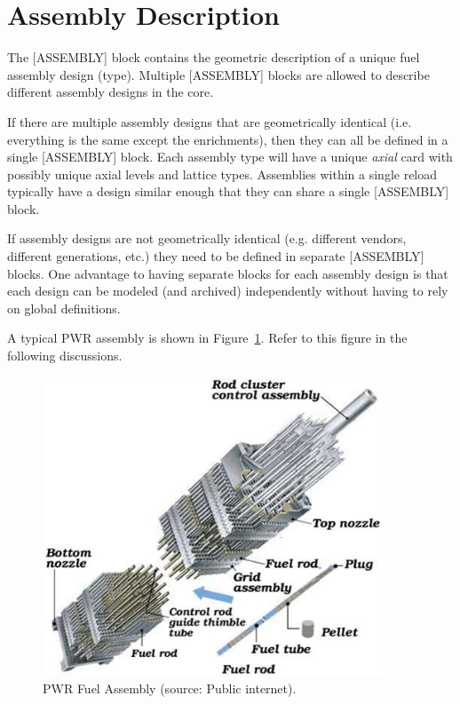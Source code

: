 %
%
\section{Assembly Description}

The [ASSEMBLY] block contains the geometric description of a unique fuel assembly design (type).
Multiple [ASSEMBLY] blocks are allowed to describe different assembly designs in the core.

If there are multiple assembly designs that are geometrically identical (i.e. everything is the same except
the enrichments), then they can all be defined in a single [ASSEMBLY] block.
Each assembly type will have a unique {\it axial} card with possibly unique axial levels and lattice types.
Assemblies within a single reload typically have a design similar enough that they can share a single
[ASSEMBLY] block.

If assembly designs are not geometrically identical (e.g. different vendors, different generations, etc.)
they need to be defined in separate [ASSEMBLY] blocks.
One advantage to having separate blocks for each assembly design is that each design can be
modeled (and archived) independently without having to rely on global definitions.

A typical PWR assembly is shown in Figure~\ref{fig:assembly}.  Refer to this figure in the following discussions.
\begin{figure}
\begin{center}
\includegraphics[width=4in]{figs/PWR-assembly.jpg}
\end{center}
\caption{\label{fig:assembly} PWR Fuel Assembly (source: Public internet).}
\end{figure}

